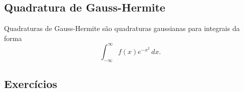 \emconstrucao

\subsection{Quadratura de Gauss-Hermite}

Quadraturas de Gauss-Hermite são quadraturas gaussianas para integrais da forma
\begin{equation}
  \int_{-\infty}^\infty f(x)e^{-x^2}\,dx.
\end{equation}

\emconstrucao

\subsection*{Exercícios}

\emconstrucao
